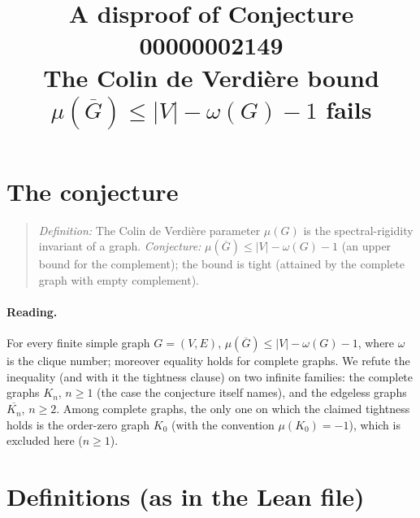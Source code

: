 \documentclass[11pt]{article}
\title{A disproof of Conjecture 00000002149\\[2pt]
\large The Colin de Verdi\`ere bound $\mu(\overline G)\le |V|-\omega(G)-1$ fails}
\date{}
\renewcommand{\_}{\oldus\allowbreak}
\theoremstyle{definition}
\theoremstyle{remark}
\begin{document}
\sloppy
\maketitle

\section{The conjecture}

\begin{quote}
\emph{Definition:} The Colin de Verdi\`ere parameter $\mu(G)$ is the spectral-rigidity invariant of a
graph. \emph{Conjecture:} $\mu(\overline G)\le |V|-\omega(G)-1$ (an upper bound for the complement); the
bound is tight (attained by the complete graph with empty complement).
\end{quote}

\paragraph{Reading.} For every finite simple graph $G=(V,E)$, $\mu(\overline G)\le|V|-\omega(G)-1$, where
$\omega$ is the clique number; moreover equality holds for complete graphs. We refute the inequality
(and with it the tightness clause) on two infinite families: the complete graphs $K_n$, $n\ge1$ (the
case the conjecture itself names), and the edgeless graphs $\overline{K_n}$, $n\ge2$. Among complete graphs, the only one
on which the claimed tightness holds is the order-zero graph $K_0$ (with the convention $\mu(K_0)=-1$),
which is excluded here ($n\ge1$).

\section{Definitions (as in the Lean file)}
\end{document}
